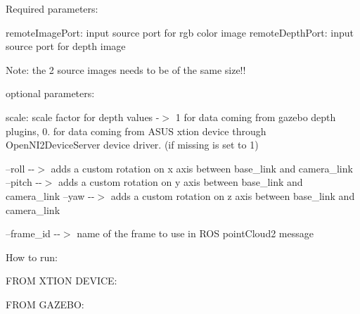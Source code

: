 Required parameters\+:

remote\+Image\+Port\+: input source port for rgb color image remote\+Depth\+Port\+: input source port for depth image

Note\+: the 2 source images needs to be of the same size!!

optional parameters\+:

scale\+: scale factor for depth values -\/$>$ 1 for data coming from gazebo depth plugins, 0. for data coming from A\+S\+US xtion device through Open\+N\+I2\+Device\+Server device driver. (if missing is set to 1)

--roll -\/-\/$>$ adds a custom rotation on x axis between base\+\_\+link and camera\+\_\+link --pitch -\/-\/$>$ adds a custom rotation on y axis between base\+\_\+link and camera\+\_\+link --yaw -\/-\/$>$ adds a custom rotation on z axis between base\+\_\+link and camera\+\_\+link

--frame\+\_\+id -\/-\/$>$ name of the frame to use in R\+OS point\+Cloud2 message

How to run\+:

F\+R\+OM X\+T\+I\+ON D\+E\+V\+I\+CE\+: 
\begin{DoxyCode}{0}
\end{DoxyCode}


F\+R\+OM G\+A\+Z\+E\+BO\+: 
\begin{DoxyCode}{0}
\end{DoxyCode}
 